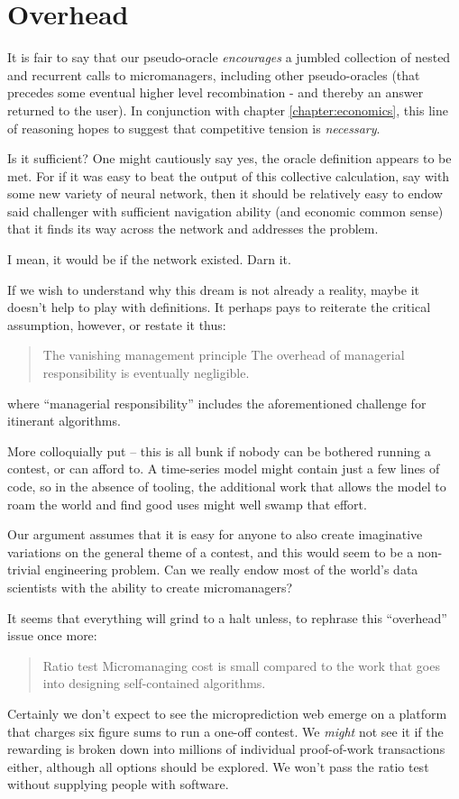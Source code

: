 \section{Overhead}





It is fair to say that our pseudo-oracle {\em encourages} a jumbled collection of nested and recurrent calls to micromanagers, including other pseudo-oracles (that precedes some eventual higher level recombination - and thereby an answer returned to the user). In conjunction with chapter \ref{chapter:economics}, this line of reasoning hopes to suggest that competitive tension is {\em necessary}.

Is it sufficient? One might cautiously say yes, the oracle definition appears to be met. For if it was easy to beat the output of this collective calculation, say with some new variety of neural network, then it should be relatively easy to endow said challenger with sufficient navigation ability (and economic common sense) that it finds its way across the network and addresses the problem. 

I mean, it would be if the network existed. Darn it. 

If we wish to understand why this dream is not already a reality, maybe it doesn't help to play with definitions. It perhaps pays to reiterate the critical assumption, however, or restate it thus:
\begin{quote}{The vanishing management principle}
   The overhead of managerial responsibility is eventually negligible. 
\end{quote}
where ``managerial responsibility'' includes the aforementioned challenge for itinerant algorithms. 

More colloquially put -- this is all bunk if nobody can be bothered running a contest, or can afford to. A time-series model might contain just a few lines of code, so in the absence of tooling, the additional work that allows the model to roam the world and find good uses might well swamp that effort. 

Our argument assumes that it is easy for anyone to also create imaginative variations on the general theme of a contest, and this would seem to be a non-trivial engineering problem. Can we really endow most of the world's data scientists with the ability to create micromanagers? 

It seems that everything will grind to a halt unless, to rephrase this ``overhead'' issue once more: 
\begin{quote}{Ratio test}
Micromanaging cost is small compared to the work that goes into designing self-contained algorithms. 
\end{quote}
Certainly we don't expect to see the microprediction web emerge on a platform that charges six figure sums to run a one-off contest. We {\em might} not see it if the rewarding is broken down into millions of individual proof-of-work transactions either, although all options should be explored. We won't pass the ratio test without supplying people with software. 


